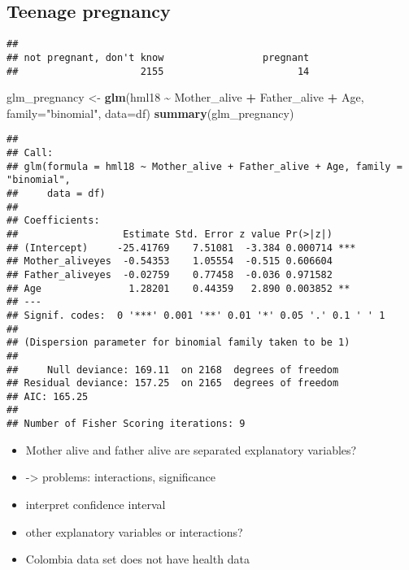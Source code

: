 \documentclass[
]{article}
\newenvironment{Shaded}{\begin{snugshade}}{\end{snugshade}}
\newcommand{\AttributeTok}[1]{\textcolor[rgb]{0.13,0.29,0.53}{#1}}
\newcommand{\FunctionTok}[1]{\textcolor[rgb]{0.13,0.29,0.53}{\textbf{#1}}}
\newcommand{\NormalTok}[1]{#1}
\newcommand{\OtherTok}[1]{\textcolor[rgb]{0.56,0.35,0.01}{#1}}
\newcommand{\SpecialCharTok}[1]{\textcolor[rgb]{0.81,0.36,0.00}{\textbf{#1}}}
\newcommand{\StringTok}[1]{\textcolor[rgb]{0.31,0.60,0.02}{#1}}
\providecommand{\tightlist}{%
  \setlength{\itemsep}{0pt}\setlength{\parskip}{0pt}}
\begin{document}
\hypertarget{teenage-pregnancy}{%
\subsection{Teenage pregnancy}\label{teenage-pregnancy}}

\begin{Shaded}
\end{Shaded}

\begin{verbatim}
## 
## not pregnant, don't know                 pregnant 
##                     2155                       14
\end{verbatim}

\begin{Shaded}
\begin{Highlighting}[]
\NormalTok{glm\_pregnancy }\OtherTok{\textless{}{-}} \FunctionTok{glm}\NormalTok{(hml18 }\SpecialCharTok{\textasciitilde{}}\NormalTok{ Mother\_alive }\SpecialCharTok{+}\NormalTok{ Father\_alive }\SpecialCharTok{+}\NormalTok{ Age,}
                     \AttributeTok{family=}\StringTok{"binomial"}\NormalTok{, }\AttributeTok{data=}\NormalTok{df)}
\FunctionTok{summary}\NormalTok{(glm\_pregnancy)}
\end{Highlighting}
\end{Shaded}

\begin{verbatim}
## 
## Call:
## glm(formula = hml18 ~ Mother_alive + Father_alive + Age, family = "binomial", 
##     data = df)
## 
## Coefficients:
##                  Estimate Std. Error z value Pr(>|z|)    
## (Intercept)     -25.41769    7.51081  -3.384 0.000714 ***
## Mother_aliveyes  -0.54353    1.05554  -0.515 0.606604    
## Father_aliveyes  -0.02759    0.77458  -0.036 0.971582    
## Age               1.28201    0.44359   2.890 0.003852 ** 
## ---
## Signif. codes:  0 '***' 0.001 '**' 0.01 '*' 0.05 '.' 0.1 ' ' 1
## 
## (Dispersion parameter for binomial family taken to be 1)
## 
##     Null deviance: 169.11  on 2168  degrees of freedom
## Residual deviance: 157.25  on 2165  degrees of freedom
## AIC: 165.25
## 
## Number of Fisher Scoring iterations: 9
\end{verbatim}

\begin{itemize}
\tightlist
\item
  Mother alive and father alive are separated explanatory variables?
\item
  -\textgreater{} problems: interactions, significance
\item
  interpret confidence interval
\item
  other explanatory variables or interactions?
\item
  Colombia data set does not have health data
\end{itemize}
\end{document}
